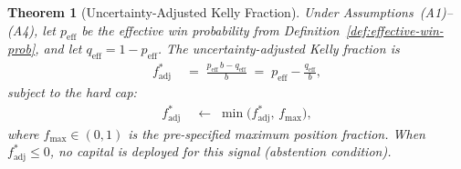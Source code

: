\documentclass[12pt,openany]{book}
\numberwithin{equation}{chapter}
\theoremstyle{plain}
\newtheorem{theorem}{Theorem}[chapter]
\theoremstyle{definition}
\theoremstyle{remark}
\numberwithin{equation}{chapter}
\theoremstyle{plain}
\begin{document}
\begin{theorem}[Uncertainty-Adjusted Kelly Fraction]
\label{thm:kelly-adjusted}
Under Assumptions~\textup{(A1)}--\textup{(A4)}, let
$p_{\mathrm{eff}}$ be the effective win probability
from Definition~\ref{def:effective-win-prob}, and let
$q_{\mathrm{eff}} = 1 - p_{\mathrm{eff}}$.
The uncertainty-adjusted Kelly fraction is
\begin{align}
  f^*_{\mathrm{adj}}
  &\;=\; \frac{p_{\mathrm{eff}}\,b - q_{\mathrm{eff}}}{b}
  \;=\; p_{\mathrm{eff}} - \frac{q_{\mathrm{eff}}}{b},
  \label{eq:kelly-adjusted}
\end{align}
subject to the hard cap:
\begin{align}
  f^*_{\mathrm{adj}}
  &\;\leftarrow\; \min\!\bigl(f^*_{\mathrm{adj}},\, f_{\max}\bigr),
  \label{eq:kelly-cap}
\end{align}
where $f_{\max} \in (0,1)$ is the pre-specified maximum position
fraction.  When $f^*_{\mathrm{adj}} \leq 0$, no capital is
deployed for this signal (abstention condition).
\end{theorem}
\end{document}
